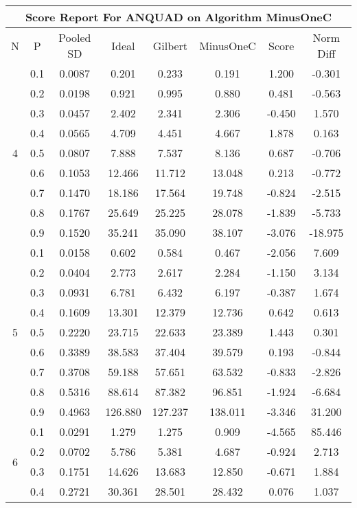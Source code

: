 \documentclass[11pt,a4paper]{report}
\begin{document}
\begin{longtable}{ | c | c || c | c | c | c | c | c | }
\hline
\multicolumn{8}{|c|}{ Score Report For ANQUAD on Algorithm MinusOneC} \\
\hline
N & P & Pooled SD &  Ideal &  Gilbert & MinusOneC  & Score & Norm Diff \\
 \hline
 \hline
 \endhead
\multirow{9}{*}{4} & 0.1 & 0.0087 & 0.201 & 0.233 & 0.191 & 1.200 & -0.301 \\
 & 0.2 & 0.0198 & 0.921 & 0.995 & 0.880 & 0.481 & -0.563 \\
 & 0.3 & 0.0457 & 2.402 & 2.341 & 2.306 & -0.450 & 1.570 \\
 & 0.4 & 0.0565 & 4.709 & 4.451 & 4.667 & 1.878 & 0.163 \\
 & 0.5 & 0.0807 & 7.888 & 7.537 & 8.136 & 0.687 & -0.706 \\
 & 0.6 & 0.1053 & 12.466 & 11.712 & 13.048 & 0.213 & -0.772 \\
 & 0.7 & 0.1470 & 18.186 & 17.564 & 19.748 & -0.824 & -2.515 \\
 & 0.8 & 0.1767 & 25.649 & 25.225 & 28.078 & -1.839 & -5.733 \\
 & 0.9 & 0.1520 & 35.241 & 35.090 & 38.107 & -3.076 & -18.975 \\
 \hline
\multirow{9}{*}{5} & 0.1 & 0.0158 & 0.602 & 0.584 & 0.467 & -2.056 & 7.609 \\
 & 0.2 & 0.0404 & 2.773 & 2.617 & 2.284 & -1.150 & 3.134 \\
 & 0.3 & 0.0931 & 6.781 & 6.432 & 6.197 & -0.387 & 1.674 \\
 & 0.4 & 0.1609 & 13.301 & 12.379 & 12.736 & 0.642 & 0.613 \\
 & 0.5 & 0.2220 & 23.715 & 22.633 & 23.389 & 1.443 & 0.301 \\
 & 0.6 & 0.3389 & 38.583 & 37.404 & 39.579 & 0.193 & -0.844 \\
 & 0.7 & 0.3708 & 59.188 & 57.651 & 63.532 & -0.833 & -2.826 \\
 & 0.8 & 0.5316 & 88.614 & 87.382 & 96.851 & -1.924 & -6.684 \\
 & 0.9 & 0.4963 & 126.880 & 127.237 & 138.011 & -3.346 & 31.200 \\
 \hline
\multirow{9}{*}{6} & 0.1 & 0.0291 & 1.279 & 1.275 & 0.909 & -4.565 & 85.446 \\
 & 0.2 & 0.0702 & 5.786 & 5.381 & 4.687 & -0.924 & 2.713 \\
 & 0.3 & 0.1751 & 14.626 & 13.683 & 12.850 & -0.671 & 1.884 \\
 & 0.4 & 0.2721 & 30.361 & 28.501 & 28.432 & 0.076 & 1.037 \\

\end{longtable}
\end{document}
